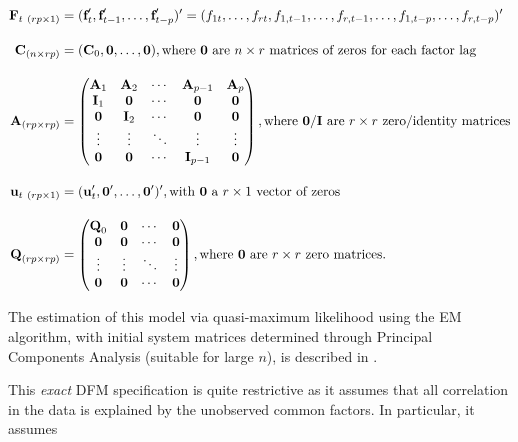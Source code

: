 \documentclass[a4paper]{article}
\begin{document}
\begin{align} \vspace{-4cm}
\textbf{F}_{t\ (rp \times 1)}  &= (\textbf{f}_t', \textbf{f}_{t-1}', \dots, \textbf{f}_{t-p}')' = (f_{1t}, \dots, f_{rt}, f_{1,t-1}, \dots, f_{r,t-1}, \dots, f_{1,t-p}, \dots, f_{r,t-p})' \\[1em]
\textbf{C}_{(n \times rp)}  &= (\textbf{C}_0, \textbf{0}, \dots, \textbf{0}), \text{where \textbf{0} are $n\times r$ matrices of zeros for each factor lag} \\[1em]
\textbf{A}_{(rp \times rp)}  &= \begin{pmatrix}
\textbf{A}_1 & \textbf{A}_2 & \cdots & \textbf{A}_{p-1}  & \textbf{A}_p \\
\textbf{I}_1 & \textbf{0} & \cdots & \textbf{0} & \textbf{0} \\
\textbf{0} & \textbf{I}_2 & \cdots & \textbf{0} & \textbf{0} \\ 
\vdots & \vdots & \ddots & \vdots & \vdots \\
\textbf{0} & \textbf{0} & \cdots & \textbf{I}_{p-1} & \textbf{0}
\end{pmatrix}, \text{where \textbf{0}/\textbf{I} are $r\times r$ zero/identity matrices} \\[1em]
\textbf{u}_{t\ (rp \times 1)}  &= (\textbf{u}_t', \textbf{0}', \dots, \textbf{0}')', \text{with \textbf{0} a $r \times 1$ vector of zeros}  \\[1em]
\textbf{Q}_{(rp \times rp)}  &= \begin{pmatrix}
\textbf{Q}_0 & \textbf{0} & \cdots & \textbf{0} \\
\textbf{0} & \textbf{0}& \cdots & \textbf{0} \\ 
\vdots & \vdots & \ddots & \vdots  \\
\textbf{0} & \textbf{0} & \cdots & \textbf{0}
\end{pmatrix}, \text{where \textbf{0} are $r\times r$ zero matrices.} 
\end{align}

The estimation of this model via quasi-maximum likelihood using the EM algorithm, with initial system matrices determined through Principal Components Analysis (suitable for large $n$), is described in \citet{doz2012quasi}. \newline

This \emph{exact} DFM specification is quite restrictive as it assumes that all correlation in the data is explained by the unobserved common factors. In particular, it assumes
\end{document}
